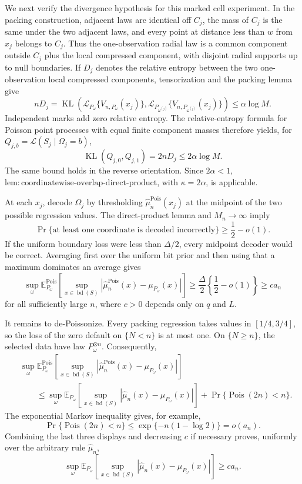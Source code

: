 We next verify the divergence hypothesis for this marked cell experiment.  In the packing construction, adjacent laws are identical off \(C_j\), the mass of \(C_j\) is the same under the two adjacent laws, and every point at distance less than \(w\) from \(x_j\) belongs to \(C_j\).  Thus the one-observation radial law is a common component outside \(C_j\) plus the local compressed component, with disjoint radial supports up to null boundaries.  If \(D_j\) denotes the relative entropy between the two one-observation local compressed components, tensorization and the packing lemma give
\[
 nD_j
 =\operatorname{KL}\!\left(
 \mathcal L_{P_\omega}\{V_{n,P_\omega}(x_j)\},
 \mathcal L_{P_{\omega^{(j)}}}\{V_{n,P_{\omega^{(j)}}}(x_j)\}
 \right)
 \leq \alpha\log M.
\]
Independent marks add zero relative entropy.  The relative-entropy formula for Poisson point processes with equal finite component masses therefore yields, for \(Q_{j,b}=\mathcal L(S_j\mid\Omega_j=b)\),
\[
 \operatorname{KL}(Q_{j,0},Q_{j,1})=2nD_j\leq 2\alpha\log M.
\]
The same bound holds in the reverse orientation.  Since \(2\alpha<1\), \(\mathrm{lem:coordinatewise\text{-}overlap\text{-}direct\text{-}product}\), with \(\kappa=2\alpha\), is applicable.

At each \(x_j\), decode \(\Omega_j\) by thresholding \(\widehat\mu_n^{\mathrm{Pois}}(x_j)\) at the midpoint of the two possible regression values.  The direct-product lemma and \(M_n\to\infty\) imply
\[
 \Pr\{\text{at least one coordinate is decoded incorrectly}\}
 \geq \frac12-o(1).
\]
If the uniform boundary loss were less than \(\Delta/2\), every midpoint decoder would be correct.  Averaging first over the uniform bit prior and then using that a maximum dominates an average gives
\[
 \sup_{\omega}
 \mathbb E_{P_\omega}^{\mathrm{Pois}}\!\left[
 \sup_{x\in\operatorname{bd}(S)}
 |\widehat\mu_n^{\mathrm{Pois}}(x)-\mu_{P_\omega}(x)|
 \right]
 \geq \frac{\Delta}{2}\left\{\frac12-o(1)\right\}
 \geq c a_n
\]
for all sufficiently large \(n\), where \(c>0\) depends only on \(q\) and \(L\).

It remains to de-Poissonize.  Every packing regression takes values in \([1/4,3/4]\), so the loss of the zero default on \(\{N<n\}\) is at most one.  On \(\{N\geq n\}\), the selected data have law \(P_\omega^{\otimes n}\).  Consequently,
\[
\begin{aligned}
 &\sup_\omega
 \mathbb E_{P_\omega}^{\mathrm{Pois}}\!\left[
 \sup_{x\in\operatorname{bd}(S)}
 |\widehat\mu_n^{\mathrm{Pois}}(x)-\mu_{P_\omega}(x)|
 \right]\\
 &\qquad\leq
 \sup_\omega
 \mathbb E_{P_\omega}\!\left[
 \sup_{x\in\operatorname{bd}(S)}
 |\widehat\mu_n(x)-\mu_{P_\omega}(x)|
 \right]
 +\Pr\{\operatorname{Pois}(2n)<n\}.
\end{aligned}
\]
The exponential Markov inequality gives, for example,
\[
 \Pr\{\operatorname{Pois}(2n)<n\}
 \leq \exp\{-n(1-\log 2)\}=o(a_n).
\]
Combining the last three displays and decreasing \(c\) if necessary proves, uniformly over the arbitrary rule \(\widehat\mu_n\),
\[
 \sup_\omega
 \mathbb E_{P_\omega}\!\left[
 \sup_{x\in\operatorname{bd}(S)}
 |\widehat\mu_n(x)-\mu_{P_\omega}(x)|
 \right]
 \geq c a_n.
\]

